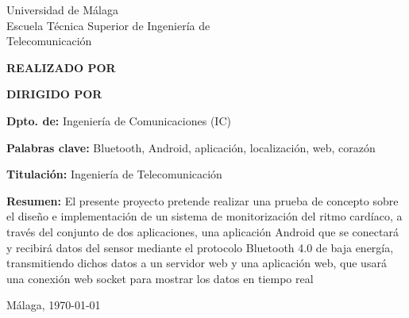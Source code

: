 
\thispagestyle{empty}
\begin{spacing}{1}

\begin{center}
	\Large \sffamily
	Universidad de Málaga\\
	Escuela Técnica Superior de Ingeniería de\\
	Telecomunicación
\end{center}

\bigskip

\begin{center}
	\Huge\scshape
	\pfctitlename
\end{center}

\bigskip

\begin{center}
	\textbf{REALIZADO POR}\\
	\textsf{\pfcauthorname}
\end{center}

\medskip

\begin{center}
	\textbf{DIRIGIDO POR}\\
	\textsf{\pfctutorname}
\end{center}

\vfill

\begin{minipage}{\textwidth}
\textbf{Dpto. de:} Ingeniería de Comunicaciones (IC)

\medskip

\textbf{Palabras clave:} Bluetooth, Android, aplicación, localización, web, corazón

\medskip

\textbf{Titulación:} Ingeniería de Telecomunicación

\medskip

\textbf{Resumen:}	
	El presente proyecto pretende realizar una prueba de concepto sobre el diseño e implementación de un sistema de monitorización del ritmo cardíaco, a través del conjunto de dos aplicaciones, una aplicación Android que se conectará y recibirá datos del sensor mediante el protocolo Bluetooth 4.0 de baja energía, transmitiendo dichos datos a un servidor web y una aplicación web, que usará una conexión web socket para mostrar los datos en tiempo real

\begin{center} Málaga, \today\end{center}
\end{minipage}
\end{spacing}
\blankpage